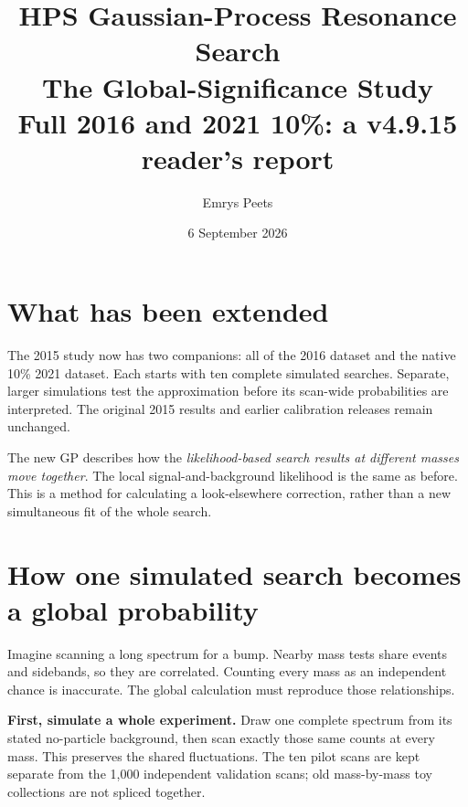 \documentclass[11pt]{article}
\title{HPS Gaussian-Process Resonance Search\\The Global-Significance Study\\\large Full 2016 and 2021 10\%: a v4.9.15 reader's report}
\author{Emrys Peets}
\date{6 September 2026}
\begin{document}
\maketitle
\begin{center}
\end{center}

\section{What has been extended}
The 2015 study now has two companions: all of the 2016 dataset and the native 10\% 2021 dataset. Each starts with ten complete simulated searches. Separate, larger simulations test the approximation before its scan-wide probabilities are interpreted. The original 2015 results and earlier calibration releases remain unchanged.

The new GP describes how the \emph{likelihood-based search results at different masses move together}. The local signal-and-background likelihood is the same as before. This is a method for calculating a look-elsewhere correction, rather than a new simultaneous fit of the whole search.




\clearpage
\section{How one simulated search becomes a global probability}
Imagine scanning a long spectrum for a bump. Nearby mass tests share events and sidebands, so they are correlated. Counting every mass as an independent chance is inaccurate. The global calculation must reproduce those relationships.

\textbf{First, simulate a whole experiment.} Draw one complete spectrum from its stated no-particle background, then scan exactly those same counts at every mass. This preserves the shared fluctuations. The ten pilot scans are kept separate from the 1,000 independent validation scans; old mass-by-mass toy collections are not spliced together.
\end{document}
